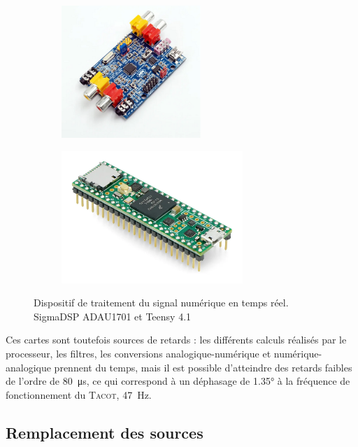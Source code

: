 \begin{figure}[!ht]
    \centering
	\begin{subfigure}{.47\textwidth}
		\centering
		\includegraphics[height=5cm]{../fig/fig_ActiveControl/ADAU1701}
		\caption{}
		\label{fig:ActiveControl_ADAU1701}
	\end{subfigure}		
	\begin{subfigure}{.47\textwidth}
		\centering
		\includegraphics[height=5cm]{../fig/fig_ActiveControl/Teensy41}
		\caption{}
		\label{fig:ActiveControl_Teensy41}
	\end{subfigure}	    
    \caption{Dispositif de traitement du signal numérique en temps réel.  SigmaDSP ADAU1701 et  Teensy 4.1}
    \label{fig:•}
\end{figure}

Ces cartes sont toutefois sources de retards : les différents calculs réalisés par le processeur, les filtres, les conversions analogique-numérique et numérique-analogique prennent du temps, mais il est possible d'atteindre des retards faibles de l'ordre de \qty{80}{\micro\second}, ce qui correspond à un déphasage de \ang{1.35} à la fréquence de fonctionnement du \textsc{Tacot}, \qty{47}{\hertz}.
\subsection{Remplacement des sources}
